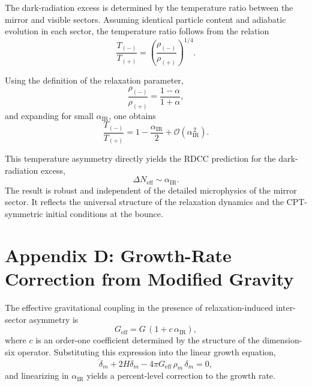\documentclass[11pt,a4paper]{article}
\begin{document}
The dark-radiation excess is determined by the temperature ratio between the mirror
and visible sectors. Assuming identical particle content and adiabatic evolution in each
sector, the temperature ratio follows from the relation
\begin{equation}
    \frac{T_{(-)}}{T_{(+)}} =
    \left( \frac{\rho_{(-)}}{\rho_{(+)}} \right)^{1/4}.
\end{equation}

Using the definition of the relaxation parameter,
\begin{equation}
    \frac{\rho_{(-)}}{\rho_{(+)}}
    = \frac{1 - \alpha}{1 + \alpha},
\end{equation}
and expanding for small $\alpha_{\mathrm{IR}}$, one obtains
\begin{equation}
    \frac{T_{(-)}}{T_{(+)}} =
    1 - \frac{\alpha_{\mathrm{IR}}}{2}
    + \mathcal{O}(\alpha_{\mathrm{IR}}^{\,2}).
\end{equation}

This temperature asymmetry directly yields the RDCC prediction for the
dark-radiation excess,
\begin{equation}
    \Delta N_{\mathrm{eff}} \sim \alpha_{\mathrm{IR}}.
\end{equation}
The result is robust and independent of the detailed microphysics of the mirror
sector. It reflects the universal structure of the relaxation dynamics and the
CPT-symmetric initial conditions at the bounce.

\section*{Appendix D: Growth-Rate Correction from Modified Gravity}

The effective gravitational coupling in the presence of relaxation-induced inter-sector
asymmetry is
\begin{equation}
    G_{\mathrm{eff}}
    = G\,(1 + c\,\alpha_{\mathrm{IR}}),
\end{equation}
where $c$ is an order-one coefficient determined by the structure of the dimension-six
operator. Substituting this expression into the linear growth equation,
\begin{equation}
    \ddot{\delta}_m + 2H\dot{\delta}_m
    - 4\pi G_{\mathrm{eff}}\,\rho_m\,\delta_m = 0,
\end{equation}
and linearizing in $\alpha_{\mathrm{IR}}$ yields a percent-level correction to the growth rate.
\end{document}
